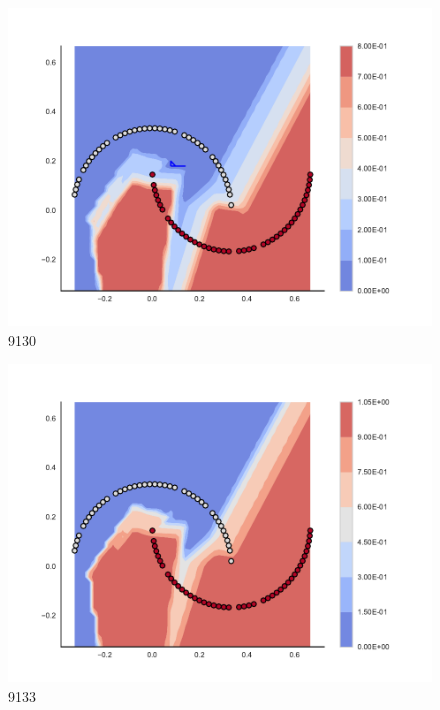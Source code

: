 \begin{subfigure}[b]{0.09\textwidth}
    \includegraphics[clip, trim=2.35cm 1.75cm 4.5cm 0cm,width=\textwidth]{img/convergence/9130.pdf}
    \caption{9130}
    \label{fig:convergence_9130}
\end{subfigure}
%
\begin{subfigure}[b]{0.09\textwidth}
    \includegraphics[clip, trim=2.35cm 1.75cm 4.5cm 0cm,width=\textwidth]{img/convergence/9133.pdf}
    \caption{9133}
    \label{fig:convergence_9133}
\end{subfigure}
%
